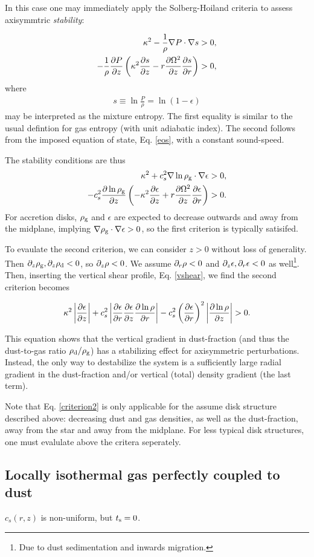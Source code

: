 In this case one may immediately apply the Solberg-Hoiland
criteria to assess axisymmtric \emph{stability}:  

\begin{align}
  \kappa^2 - \frac{1}{\rho}\nabla P \cdot \nabla s &> 0,\\
  -\frac{1}{\rho}\frac{\partial P}{\partial z} \left(\kappa^2 \frac{\partial s}{\partial z} -
  r\frac{\partial\Omega^2}{\partial z}\frac{\partial s}{\partial r}\right) &>0, 
\end{align}  
where 
\begin{align}
  s \equiv \ln \frac{P}{\rho} = \ln{(1-\epsilon)} 
\end{align}
may be interpreted as the mixture entropy. The first equality is
similar to the usual defintion for gas entropy (with unit adiabatic
index). The second follows from the imposed equation of state,
Eq. \ref{eos}, with a constant sound-speed. 

The stability conditions are thus
\begin{align}
  \kappa^2 + c_s^2 \nabla\ln{\rho_\mathrm{g}}\cdot\nabla\epsilon &> 0,  \\
  -c_s^2\frac{\partial\ln{\rho_\mathrm{g}}}{\partial z}\left(-\kappa^2\frac{\partial\epsilon}{\partial
    z} + r\frac{\partial\Omega^2}{\partial z}\frac{\partial \epsilon}{\partial r} \right) & > 0. 
\end{align}
For accretion disks, $\rho_\mathrm{g}$ and $\epsilon$ are expected to decrease
outwards and away from the midplane, implying 
$\nabla\rho_\mathrm{g}\cdot\nabla\epsilon>0$, so the first criterion is
typically satisifed. 

To evaulate the second criterion, we can consider $z>0$ without loss
of generality. Then $\partial_z\rho_\mathrm{g},\partial_z\rho_\mathrm{d} <0$, so $\partial_z\rho<0$. We
assume $\partial_r\rho <0$ and $\partial_z\epsilon, \partial_r\epsilon <0$ as
well\footnote{Due to dust sedimentation and inwards migration.}. Then,
inserting the vertical shear profile, Eq. \ref{vshear}, we find the
second criterion becomes   

\begin{align} 
  \kappa^2\left|\frac{\partial\epsilon}{\partial z}\right| + c_s^2\left|\frac{\partial
    \epsilon}{\partial r}\frac{\partial\epsilon}{\partial z}\frac{\partial\ln{\rho}}{\partial
    r}\right| - c_s^2 \left(\frac{\partial\epsilon}{\partial
    r}\right)^2\left|\frac{\partial\ln{\rho}}{\partial z}\right| > 0.  \label{criterion2}
\end{align}

This equation shows that the vertical gradient in dust-fraction (and
thus the dust-to-gas ratio $\rho_\mathrm{d}/\rho_\mathrm{g}$) has a stabilizing effect for
axisymmetric perturbations. Instead, the only way to destabilize the
system is a sufficiently large radial gradient in the dust-fraction
and/or vertical (total) density gradient (the last term).  

Note that Eq. \ref{criterion2} is only applicable for the assume disk
structure described above: decreasing dust and gas densities, as well
as the dust-fraction, away from the star and away from the
midplane. For less typical disk structures, one must evalulate above the
critera seperately. 

\subsection{Locally isothermal gas perfectly coupled to dust} 
$c_s(r,z)$ is non-uniform, but $t_\mathrm{s}=0$. 

